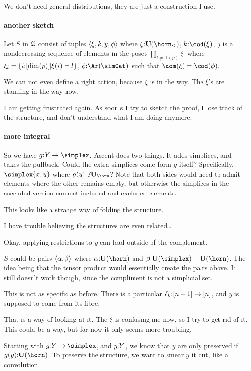 \documentclass[csh.tex]{subfiles}
\begin{document}
We don't need general distributions, they are just a construction I use.

\paragraph{another sketch}
Let $S$ in $\mathfrak A$ consist of tuples $\left\langle \xi,k,y,\phi \right\rangle$ where 
$\xi\of\base(\horn_{\leq})$, 
$k\of \cod(\xi)$, 
$y$ is a nondecreasing sequence of elements in the poset $\prod_{l\neq \top(p)} \xi_l$ where $\xi_l = \left\{i \mathord : [\dim(p)] | \xi(i) = l \right\}$, 
$\phi\of\Ar(\simCat)$ such that $\dom(\xi) = \cod(\phi)$.

We can not even define a right action, because $\xi$ is in the way.
The $\xi$'s are standing in the way now.

I am getting frustrated again. As soon s I try to sketch the proof, I lose track of the structure, and don't understand what I am doing anymore.

\paragraph{more integral}
So we have $g\of Y\to\simplex$. Ascent does two things. It adds simplices, and takes the pullback. Could the extra simplices come form $g$ itself? Specifically, $\simplex{x,y}$ where $g(y)\not\of\base_{\horn}$? Note that both sides would need to admit elements where the other remains empty, but otherwise the simplices in the ascended version connect included and excluded elements.

This looks like a strange way of folding the structure.

I have trouble believing the structures are even related\dots

Okay, applying restrictions to $y$ can lead outside of the complement.

$S$ could be pairs $\left\langle \alpha,\beta \right\rangle$ where $\alpha\of\base(\horn)$ and $\beta \of \base(\simplex)-\base(\horn)$. The idea being that the tensor product would essentially create the pairs above.
It still doesn't work though, since the compliment is not a simplicial set.

This is not as specific as before. There is a particular $\delta_k\mathord :[n-1]\to[n]$, and $y$ is supposed to come from its fibre.

That is a way of looking at it.
The $\xi$ is confusing me now, so I try to get rid of it. This could be a way, but for now it only seems more troubling.

Starting with $g\of Y\to \simplex$, and $y\mathord : Y$, we know that $y$ are only preserved if $g(y)\of\base(\horn)$. To preserve the structure, we want to smear $y$ it out, like a convolution.
\end{document}
